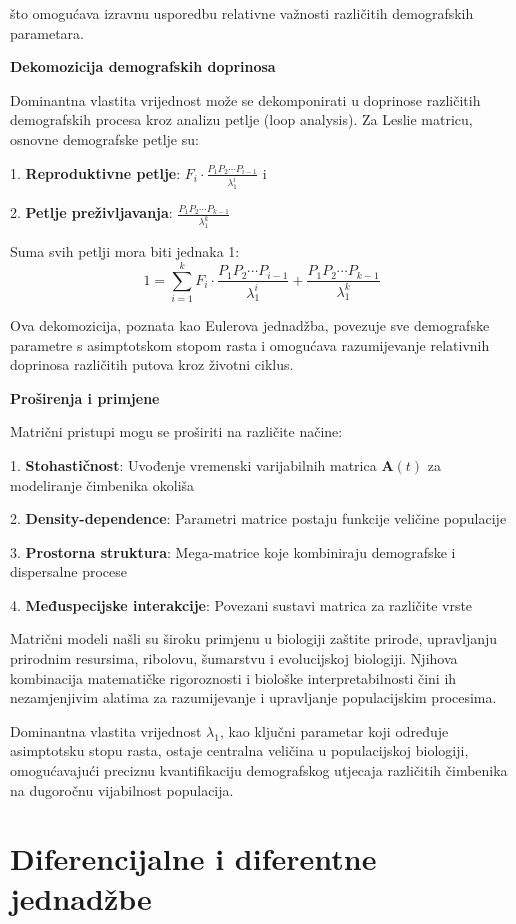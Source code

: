 \documentclass[11pt,oneside]{book}
\begin{document}
što omogućava izravnu usporedbu relativne važnosti različitih demografskih parametara.

\textbf{Dekomozicija demografskih doprinosa}

Dominantna vlastita vrijednost može se dekomponirati u doprinose različitih demografskih procesa kroz analizu petlje (loop analysis). Za Leslie matricu, osnovne demografske petlje su:

1. \textbf{Reproduktivne petlje}: $F_i \cdot \frac{P_1 P_2 \cdots P_{i-1}}{\lambda_1^i}$ i 

2. \textbf{Petlje preživljavanja}: $\frac{P_1 P_2 \cdots P_{k-1}}{\lambda_1^k}$

Suma svih petlji mora biti jednaka 1:
$$1 = \sum_{i=1}^k F_i \cdot \frac{P_1 P_2 \cdots P_{i-1}}{\lambda_1^i} + \frac{P_1 P_2 \cdots P_{k-1}}{\lambda_1^k}$$

Ova dekomozicija, poznata kao Eulerova jednadžba, povezuje sve demografske parametre s asimptotskom stopom rasta i omogućava razumijevanje relativnih doprinosa različitih putova kroz životni ciklus.

\textbf{Proširenja i primjene}

Matrični pristupi mogu se proširiti na različite načine:

1. \textbf{Stohastičnost}: Uvođenje vremenski varijabilnih matrica $\mathbf{A}(t)$ za modeliranje čimbenika okoliša

2. \textbf{Density-dependence}: Parametri matrice postaju funkcije veličine populacije

3. \textbf{Prostorna struktura}: Mega-matrice koje kombiniraju demografske i dispersalne procese

4. \textbf{Međuspecijske interakcije}: Povezani sustavi matrica za različite vrste


Matrični modeli našli su široku primjenu u biologiji zaštite prirode, upravljanju prirodnim resursima, ribolovu, šumarstvu i evolucijskoj biologiji. Njihova kombinacija matematičke rigoroznosti i biološke interpretabilnosti čini ih nezamjenjivim alatima za razumijevanje i upravljanje populacijskim procesima.

Dominantna vlastita vrijednost $\lambda_1$, kao ključni parametar koji određuje asimptotsku stopu rasta, ostaje centralna veličina u populacijskoj biologiji, omogućavajući preciznu kvantifikaciju demografskog utjecaja različitih čimbenika na dugoročnu vijabilnost populacija.


\section{Diferencijalne i diferentne jednadžbe}
\end{document}
